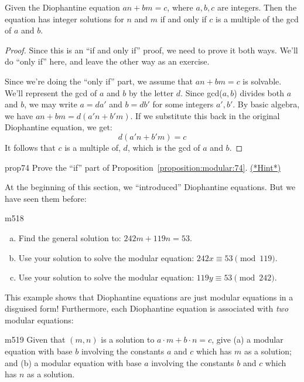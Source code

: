 \begin{prop}{74}
Given the Diophantine equation $an + bm = c$, where $a,b,c$ are integers. Then the equation  has integer solutions for $n$ and $m$  if and only if $c$ is a multiple of the gcd of $a$ and $b$.
\end{prop}
\begin{proof}{}
Since this is an ``if and only if'' proof, we need to prove it both ways.  We'll do ``only if''  here, and leave the other way as an exercise.

Since we're doing the ``only if'' part, we assume that $an + bm = c$ is solvable.
We'll represent the gcd of $a$ and $b$ by the letter $d$. Since gcd($a,b$) divides both $a$ and $b$, we may write $a = da'$ and $b = db'$ for some integers $a',b'$.  By basic algebra, we have $an+bm =d(a'n +b'm)$. If we substitute this back in the original Diophantine equation, we get:
\[d(a'n +b'm)=c\]
It follows that $c$ is a multiple of, $d$, which is the gcd of $a$ and $b$.
\end{proof}

\begin{exercise}{prop74}
Prove the ``if'' part of Proposition~\ref{proposition:modular:74}. 
\hyperref[sec:modular_arithmetic:hints]{(*Hint*)}
\end{exercise}


At the beginning of this section, we ``introduced'' Diophantine equations.  But we have seen them before:

\begin{exercise}{m518}
\begin{enumerate}[(a)]
\item
Find the general solution to: $242m + 119n = 53$.
\item 
Use your solution to solve the modular equation: $242x \equiv 53 \pmod{119}$.
\item
Use your solution to solve the modular equation:  $119y \equiv 53 \pmod{242}$.
\end{enumerate}
\end{exercise}
This example shows that Diophantine equations are just modular equations in a disguised form!  Furthermore, each Diophantine equation is associated with \emph{two} modular equations:

\begin{exercise}{m519}
Given that $(m,n)$ is a solution to $a \cdot m + b \cdot n  = c$, give (a) a modular equation with base $b$  involving the constants $a$ and $c$ which has $m$ as a solution; and (b) a modular equation with base $a$ involving the constants $b$ and $c$ which has $n$ as a solution.
\end{exercise}


